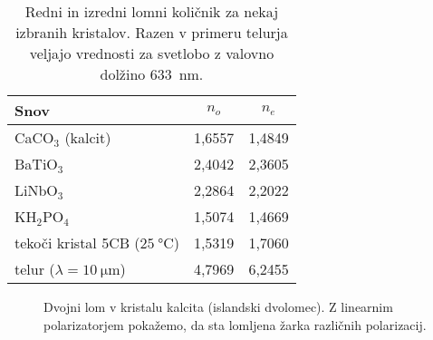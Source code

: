 \begin{table}[h]
 \centering
\begin{tabular}{|l|c|c|} \hline  
      Snov & $n_o$ & $n_e$ \\ \hline
      CaCO$_3$ (kalcit) & 1,6557 & 1,4849 \\ \hline\index{CaCO$_3$|see {Kalcit}}
      BaTiO$_3$ & 2,4042 & 2,3605 \\ \hline \index{BaTiO$_3$}
      LiNbO$_3$ & 2,2864 & 2,2022 \\ \hline \index{LiNbO$_3$}
      KH$_2$PO$_4$ & 1,5074 & 1,4669 \\ \hline \index{KH$_2$PO$_4$}
      tekoči kristal 5CB ($25~\si{\degreeCelsius}$) & 1,5319 & 1,7060 \\ \hline \index{Tekoči kristali} \index{Telur}
      telur ($\lambda = 10~\si{\micro\metre}$) & 4,7969 & 6,2455 \\ 
\hline 
\end{tabular}
  \caption{Redni in izredni lomni količnik za nekaj izbranih kristalov. Razen v primeru telurja
   veljajo vrednosti za svetlobo z valovno dolžino 633~\si{\nano\metre}.}
\label{table:none}
\end{table}

\begin{figure}[h]
\centering
\def\svgwidth{140truemm} 

\caption{Dvojni lom v kristalu kalcita (islandski dvolomec). 
Z linearnim polarizatorjem pokažemo, da sta lomljena žarka različnih
polarizacij.}
\label{foto:dvolom}
\end{figure}
